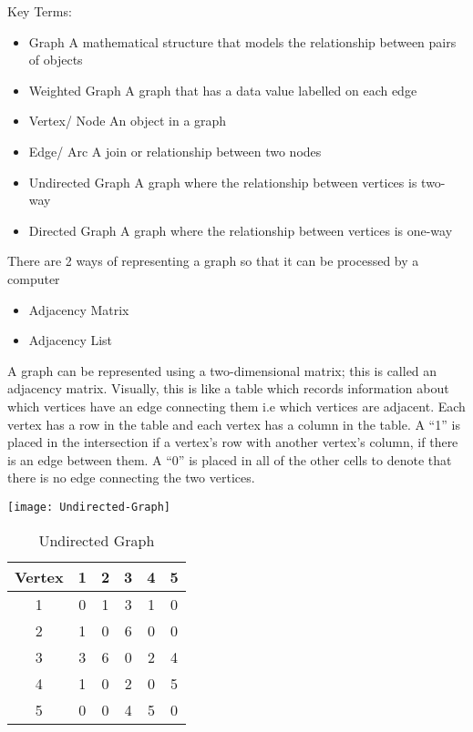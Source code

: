   Key Terms:
  \begin{itemize}
  	\item Graph
	  	\subitem A mathematical structure that models the relationship between pairs of objects
  	\item Weighted Graph
	  	\subitem A graph that has a data value labelled on each edge
  	\item Vertex/ Node
	  	\subitem An object in a graph
  	\item Edge/ Arc
	  	\subitem A join or relationship between two nodes
  	\item Undirected Graph
	  	\subitem A graph where the relationship between vertices is two-way
  	\item Directed Graph
	  	\subitem A graph where the relationship between vertices is one-way
  \end{itemize}

  There are 2 ways of representing a graph so that it can be processed by a computer
  \begin{itemize}
  	\item Adjacency Matrix
  	\item Adjacency List
  \end{itemize}

  A graph can be represented using a two-dimensional matrix; this is called an adjacency matrix. Visually, this is like a table which records information about which vertices have an edge connecting them i.e which vertices are adjacent. Each vertex has a row in the table and each vertex has a column in the table. A ``1'' is placed in the intersection if a vertex's row with another vertex's column, if there is an edge between them. A ``0'' is placed in all of the other cells to denote that there is no edge connecting the two vertices.

  \texttt{[image: Undirected-Graph]}

  \begin{table}[H]
	  	\begin{tabular}{c | c c c c c}
	  		Vertex	&	1	&	2	&	3	&	4	&	5 	\\ \hline
	  		1		&	0	&	1	&	3	&	1	&	0	\\
	  		2		&	1	&	0	&	6	&	0	&	0	\\
	  		3		&	3	&	6	&	0	&	2	&	4	\\
	  		4		&	1	&	0	&	2	&	0	&	5	\\
	  		5		&	0	&	0	&	4	&	5	&	0	\\
	  	\end{tabular}
  	\caption{Undirected Graph}
  \end{table}


